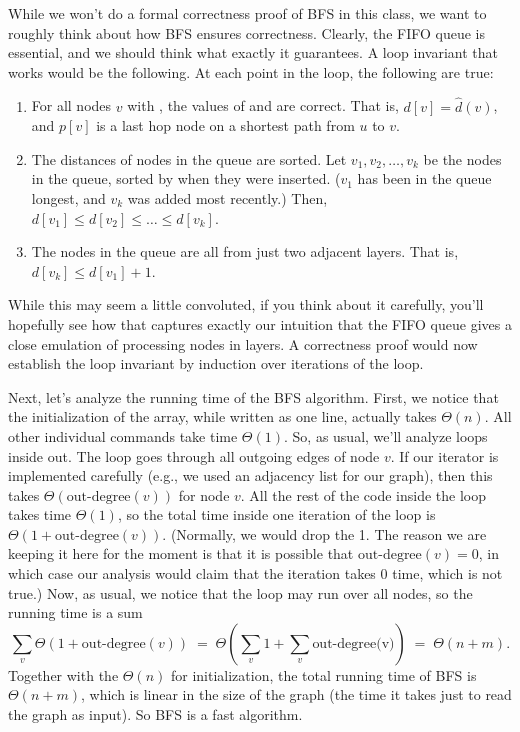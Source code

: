 While we won't do a formal correctness proof of BFS in this
class, we want to roughly think about how BFS ensures correctness.
Clearly, the FIFO queue is essential, and we should think what exactly
it guarantees. A loop invariant that works would be the following.
At each point in the  loop, the following are true:
\begin{enumerate}
\item For all nodes $v$ with , the values of
   and  are correct. 
  That is, $d[v] = \hat{d}(v)$, and $p[v]$ is a last hop node on a
  shortest path from $u$ to $v$.
\item The distances of nodes in the queue are sorted.
  Let $v_1, v_2, \ldots, v_k$ be the nodes in the queue, sorted by
  when they were inserted. ($v_1$ has been in the queue longest, and
  $v_k$ was added most recently.) 
  Then, $d[v_1] \leq d[v_2] \leq \ldots \leq d[v_k]$.
\item The nodes in the queue are all from just two adjacent layers.
  That is, $d[v_k] \leq d[v_1] + 1$.
\end{enumerate}
While this may seem a little convoluted, if you think about it
carefully, you'll hopefully see how that captures exactly our
intuition that the FIFO queue gives a close emulation of processing
nodes in layers. A correctness proof would now establish the loop
invariant by induction over iterations of the  loop.

Next, let's analyze the running time of the BFS algorithm.
First, we notice that the initialization of the  array,
while written as one line, actually takes $\Theta(n)$.
All other individual commands take time $\Theta(1)$.
So, as usual, we'll analyze loops inside out.
The  loop goes through all outgoing edges of node $v$.
If our iterator is implemented carefully (e.g., we used an adjacency
list for our graph), then this takes $\Theta(\text{out-degree}(v))$
for node $v$. All the rest of the code inside the  loop
takes time $\Theta(1)$, so the total time inside one iteration of the
loop is $\Theta(1+\text{out-degree}(v))$.
(Normally, we would drop the 1. The reason we are keeping it here for
the moment is that it is possible that $\text{out-degree}(v) = 0$, in
which case our analysis would claim that the iteration takes 0 time,
which is not true.)
Now, as usual, we notice that the  loop may run over all
nodes, so the running time is a sum
\[
\sum_v \Theta(1+\text{out-degree}(v))
\; = \; \Theta(\sum_v 1 + \sum_v \text{out-degree(v)})
\; = \; \Theta(n+m).
\]
Together with the $\Theta(n)$ for initialization, the total running
time of BFS is $\Theta(n+m)$, which is linear in the size of the graph
(the time it takes just to read the graph as input).
So BFS is a fast algorithm.


